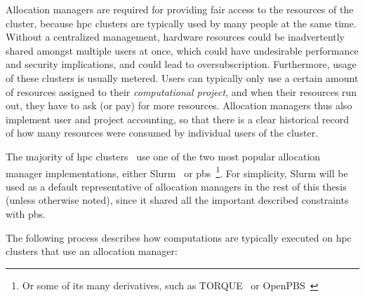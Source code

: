 Allocation managers are required for providing fair access to the resources of the cluster, because
\gls{hpc} clusters are typically used by many people at the same time. Without a
centralized management, hardware resources could be inadvertently shared amongst multiple users at
once, which could have undesirable performance and security implications, and could lead to
oversubscription. Furthermore, usage of these clusters is usually metered. Users can typically only
use a certain amount of resources assigned to their \emph{computational project}, and when their
resources run out, they have to ask (or pay) for more resources. Allocation managers thus also
implement user and project accounting, so that there is a clear historical record of how many
resources were consumed by individual users of the cluster.

The majority of \gls{hpc} clusters~\cite{slurm-schedmd} use one of the two
most popular allocation manager implementations, either Slurm~\cite{slurm} or
\gls{pbs}~\cite{pbs}\footnote{Or some of its many derivatives,
such as TORQUE~\cite{torque} or OpenPBS~\cite{openpbs}}. For simplicity,
Slurm will be used as a default representative of allocation managers in the rest of this thesis
(unless otherwise noted), since it shared all the important described constraints with
\gls{pbs}.

The following process describes how computations are typically executed on
\gls{hpc} clusters that use an allocation manager:

